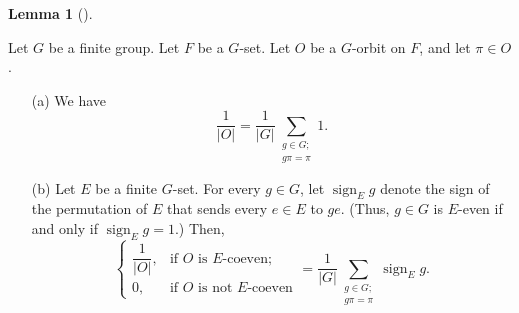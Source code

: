\documentclass[numbers=enddot,12pt,final,onecolumn,notitlepage,abstracton]{scrartcl}%
\theoremstyle{definition}
\newtheorem{lem}[theo]{Lemma}
\newenvironment{lemma}[1][]
{\begin{lem}[#1]\begin{leftbar}}
{\end{leftbar}\end{lem}}
\let\sumnonlimits\sum
\renewcommand{\sum}{\sumnonlimits\limits}
\newcommand{\sign}{\operatorname{sign}}
\begin{document}
\begin{lemma}
\label{lem.burnside.sums} Let $G$ be a finite group. Let $F$ be a
$G$-set. Let $O$ be a $G$-orbit on $F$, and let $\pi\in O$.

\begin{enumerate}
\item[(a)] We have
\begin{equation}
\dfrac{1}{\left\vert O\right\vert }=\dfrac{1}{\left\vert G\right\vert }%
\sum_{\substack{g\in G;\\g\pi=\pi}}1.\label{eq.lem.burnside.sums.a}%
\end{equation}


\item[(b)] Let $E$ be a finite $G$-set. For every $g\in G$, let
$\sign_E g$ denote the sign of the permutation of $E$ that
sends every $e\in E$ to $ge$. (Thus, $g\in G$ is $E$-even if and only if
$\sign_E g = 1$.) Then,
\begin{equation}
\begin{cases}
\dfrac{1}{\left\vert O\right\vert }, & \text{if }O\text{ is }E\text{-coeven}%
;\\
0, & \text{if }O\text{ is not }E\text{-coeven}%
\end{cases}
=
\dfrac{1}{\left\vert G\right\vert }
\sum_{\substack{g\in G;\\ g\pi=\pi}} \sign_E g .
\label{eq.lem.burnside.sums.b}
\end{equation}

\end{enumerate}
\end{lemma}
\end{document}
